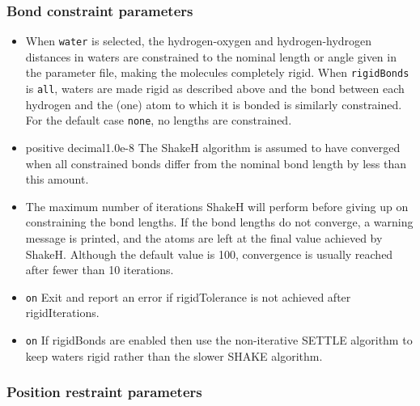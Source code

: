 \subsubsection{Bond constraint parameters}
\label{section:rigidBonds}
\begin{itemize}
\item
{} 
{When {\tt water} is selected, the hydrogen-oxygen and hydrogen-hydrogen
distances in waters are constrained to the nominal length or angle given
in the parameter file, making the molecules completely rigid.
When {\tt rigidBonds} is {\tt all}, waters are made rigid as described above
and the bond between each hydrogen and the (one) atom to which
it is bonded is similarly constrained.
For the default case {\tt none}, no lengths are constrained.
}

\item
{}
{positive decimal}{1.0e-8}
{
The ShakeH algorithm is assumed to have converged when all constrained
bonds differ from the nominal bond length by less than this amount.
}

\item
{}
{
The maximum number of iterations ShakeH will perform before giving up
on constraining the bond lengths.  If the bond lengths do not
converge, a warning message is printed, and the atoms are left at the
final value achieved by ShakeH.  
Although the default value is 100, 
convergence is usually reached after fewer than 10 iterations.
}

\item
{}
{{\tt on}}
{
Exit and report an error if rigidTolerance is not achieved after rigidIterations.
}

\item
{}
{{\tt on}}
{
If rigidBonds are enabled then use the non-iterative SETTLE algorithm to
keep waters rigid rather than the slower SHAKE algorithm.
}
\end{itemize}

\subsubsection{Position restraint parameters}


